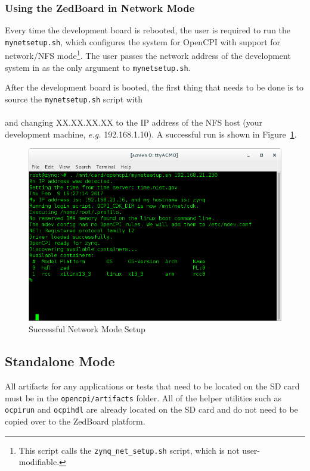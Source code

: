\subsubsection*{Using the ZedBoard in Network Mode}
\begin{flushleft}
Every time the development board is rebooted, the user is required to run the \texttt{mynetsetup.sh}, which configures the system for OpenCPI with support for network/NFS mode\footnote{This script calls the \texttt{zynq\_net\_setup.sh} script, which is not user-modifiable.}. The user passes the network address of the development system in as the only argument to \texttt{mynetsetup.sh}.
\end{flushleft}
\begin{flushleft}
\newpage
After the development board is booted, the first thing that needs to be done is to source the \texttt{mynetsetup.sh} script with\\
\leavevmode{\parindent=3em\indent}\\
and changing XX.XX.XX.XX to the IP address of the NFS host (your development machine, \textit{e.g.} 192.168.1.10). A successful run is shown in Figure~\ref{fig:netsetup}.
\end{flushleft}
\begin{figure}[H]
	\centerline{\includegraphics[scale=0.5]{zed_net_setup}}
	\caption{Successful Network Mode Setup}
	\label{fig:netsetup}
\end{figure}
\newpage
\subsection{Standalone Mode}
All artifacts for any applications or tests that need to be located on the SD card must be in the \texttt{opencpi/artifacts} folder.  All of the helper utilities such as \texttt{ocpirun} and \texttt{ocpihdl} are already located on the SD card and do not need to be copied over to the ZedBoard platform.


